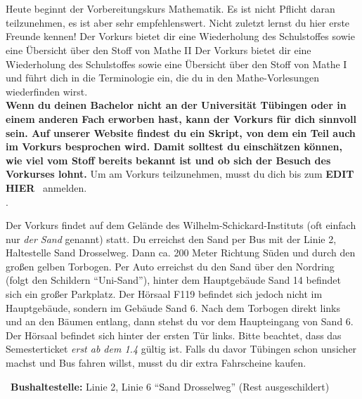 \begin{description}
\ifml
	\item~ %
\else
	\item[TBA, TBA, TBA]\ \\
  Heute beginnt der Vorbereitungskurs Mathematik. Es ist nicht Pflicht daran teilzunehmen,
	es ist aber sehr empfehlenswert. Nicht zuletzt lernst du hier erste Freunde kennen!
	\ifsommersemester
	Der Vorkurs bietet dir eine Wiederholung des Schulstoffes sowie eine Übersicht über den Stoff von Mathe II
	\fi
	\ifwintersemester
	Der Vorkurs bietet dir eine Wiederholung des Schulstoffes sowie eine Übersicht über den Stoff von Mathe I
	\fi
	und führt dich in die Terminologie ein, die du in den Mathe-Vorlesungen wiederfinden wirst.
	\ifmaster
	\\
	\textbf{Wenn du deinen Bachelor nicht an der Universität Tübingen oder in einem anderen Fach erworben hast, kann der Vorkurs für dich sinnvoll sein. Auf unserer Website findest du ein Skript, von dem ein Teil auch im Vorkurs besprochen wird. Damit solltest du einschätzen können, wie viel vom Stoff bereits bekannt ist und ob sich der Besuch des Vorkurses lohnt.}
	\fi
    Um am Vorkurs teilzunehmen, musst du dich bis zum \textbf{EDIT HIER} \YEAR~anmelden.\\
    \url{}.

	\ifsommersemester
	Der Vorkurs findet auf dem Gelände des Wilhelm-Schickard-Instituts (oft einfach nur \emph{der Sand} genannt) statt. Du erreichst den Sand per Bus mit der Linie 2, Haltestelle Sand Drosselweg. Dann ca. 200 Meter Richtung Süden und durch den großen gelben Torbogen. Per Auto erreichst du den Sand über den Nordring (folgt den Schildern "`Uni-Sand"'), hinter dem Hauptgebäude Sand 14 befindet sich ein großer Parkplatz. Der Hörsaal F119 befindet sich jedoch nicht im Hauptgebäude, sondern im Gebäude Sand 6. Nach dem Torbogen direkt links und an den Bäumen entlang, dann stehst du vor dem Haupteingang von Sand 6. Der Hörsaal befindet sich hinter der ersten Tür links.
	Bitte beachtet, dass das Semesterticket \emph{erst ab dem 1.4} gültig ist. Falls du davor Tübingen schon unsicher machst und Bus fahren willst, musst du dir extra Fahrscheine kaufen.
	\fi

	~\textbf{Bushaltestelle:} Linie 2, Linie 6 "`Sand Drosselweg"' (Rest ausgeschildert)
\fi


\end{description}
